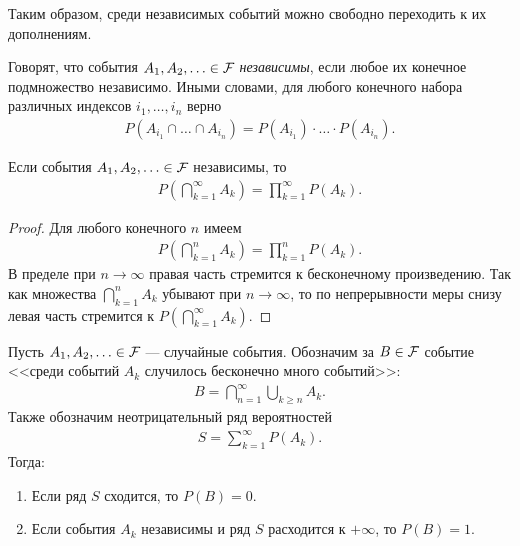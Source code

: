 \documentclass[../main.tex]{subfiles}
\begin{document}
Таким образом, среди независимых событий можно свободно переходить к их дополнениям.

\begin{df}
 Говорят, что события $A_1, A_2, \ldots \in \mathcal F$ \textit{независимы}, если любое их конечное подмножество независимо. Иными словами, для любого конечного набора различных индексов $i_1, \ldots, i_n$ верно
 \begin{align*}
  P(A_{i_1} \cap \ldots \cap A_{i_n}) = P(A_{i_1}) \cdot \ldots \cdot P(A_{i_n}).
 \end{align*} 
\end{df}
\begin{remrk}
 \label{remark:independent_infinite_product}
 Если события $A_1, A_2, \ldots \in \mathcal F$  независимы, то
 \begin{align*}
  P \left( \bigcap_{k=1}^{\infty} A_k \right) = \prod_{k=1}^{\infty} P(A_k).
 \end{align*} 
\end{remrk}
\begin{proof}
 Для любого конечного $n$ имеем
 \begin{align*}
  P \left( \bigcap_{k=1}^{n} A_k \right) = \prod_{k=1}^{n} P(A_k)
 .\end{align*} В пределе при $n \to \infty$ правая часть стремится к бесконечному произведению. Так как множества $ \bigcap_{k=1}^{n}A_k  $ убывают при $ n \to \infty $, то по непрерывности меры снизу левая часть стремится к  $ P( \bigcap_{k=1}^{\infty} A_k)  $.
\end{proof}
\begin{lm}
 \label{lemma:borel_cantelli}
 Пусть $A_1, A_2, \ldots \in \mathcal F$  --- случайные события. Обозначим за $ B \in \mathcal F$ событие <<среди событий $ A_k $ случилось бесконечно много событий>>:
 \begin{align*}
  B = \bigcap_{n=1}^{\infty} \bigcup_{k \geqslant n} A_k.
 \end{align*} Также обозначим неотрицательный ряд вероятностей
 \begin{align*}
  S = \sum_{k=1}^{\infty} P(A_k).
 \end{align*}  Тогда:
 \begin{enumerate}
  \item \label{enum1:lemma:borel_cantelli} Если ряд $ S $ сходится, то $P(B) = 0$.
  \item \label{enum2:lemma:borel_cantelli} Если события $A_k$  независимы и ряд $ S $ расходится к $ +\infty $, то $P(B) = 1$.
 \end{enumerate} 
\end{lm}
\end{document}
